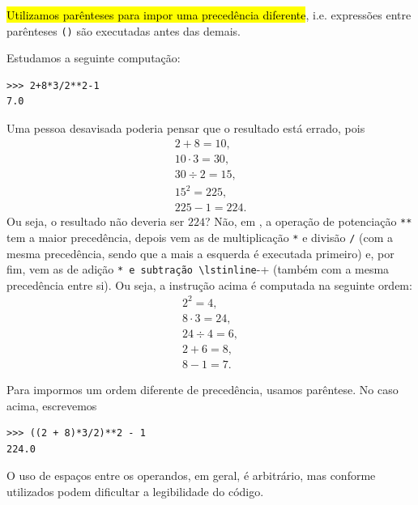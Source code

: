 \hl{Utilizamos parênteses para impor uma precedência diferente}, i.e. expressões entre parênteses \lstinline+()+ são executadas antes das demais.

\begin{ex}
  Estudamos a seguinte computação:

\begin{lstlisting}
>>> 2+8*3/2**2-1
7.0
\end{lstlisting}

  Uma pessoa desavisada poderia pensar que o resultado está errado, pois
  \begin{gather}
    2+8 = 10,\\
    10 \cdot 3 = 30,\\
    30 \div 2 = 15,\\
    15^2 = 225,\\
    225 - 1 = 224.
  \end{gather}
  Ou seja, o resultado não deveria ser $224$? Não, em {\python}, a operação de potenciação \lstinline+**+ tem a maior precedência, depois vem as de multiplicação \lstinline+*+ e divisão \lstinline+/+ (com a mesma precedência, sendo que a mais a esquerda é executada primeiro) e, por fim, vem as de adição \lstinline*+* e subtração \lstinline+-+ (também com a mesma precedência entre si). Ou seja, a instrução acima é computada na seguinte ordem:
  \begin{gather}
    2^2 = 4,\\
    8\cdot 3 = 24,\\
    24\div 4 = 6,\\
    2 + 6 = 8,\\
    8 - 1 = 7.
  \end{gather}

  Para impormos um ordem diferente de precedência, usamos parêntese. No caso acima, escrevemos

\begin{lstlisting}
>>> ((2 + 8)*3/2)**2 - 1
224.0
\end{lstlisting}

\end{ex}

O uso de espaços entre os operandos, em geral, é arbitrário, mas conforme utilizados podem dificultar a legibilidade do código.


